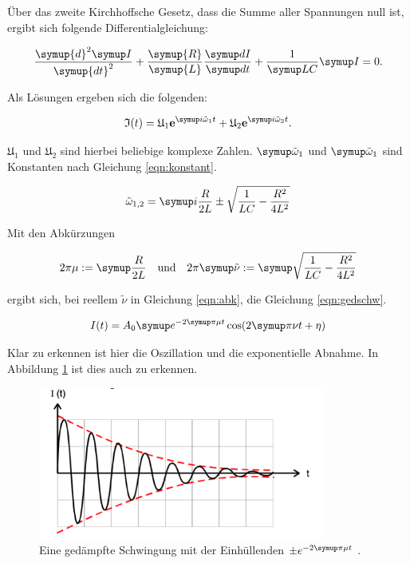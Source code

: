 Über das zweite Kirchhoffsche Gesetz, dass die Summe aller Spannungen null ist, ergibt
sich folgende Differentialgleichung:

\begin{equation}
  \frac{\symup{d}^2 \g{I}}{\symup{d t}^2} + \frac{\symup{R}}{\symup{L}}
  \frac{\g{d I}}{\g{d t}} + \frac{1}{\g{L C}} \g{I} = 0.
  \label{eqn:dgl}
\end{equation}

Als Lösungen ergeben sich die folgenden:

\begin{equation}
  \mathfrak{I}(t) = \mathfrak{U}_1 \textbf{e}^{\g{i\tilde{\omega}_1t}} + \mathfrak{U}_2
  \textbf{e}^{\g{i\tilde{\omega}_2t}}.
\end{equation}

$\mathfrak{U}_1$ und $\mathfrak{U}_2$ sind hierbei beliebige komplexe Zahlen.
$\g{\tilde{\omega}}_\text{1}$ und $\g{\tilde{\omega}}_\text{1}$ sind Konstanten nach Gleichung
\eqref{eqn:konstant}.

\begin{equation}
  \tilde{\omega}_{1,2} = \g{i\frac{R}{2 L} \pm \sqrt{\frac{1}{L C} - \frac{R^2}{4 L^2}}}
  \label{eqn:konstant}
\end{equation}

Mit den Abkürzungen

\begin{align}
  2 \pi \mu := \g{\frac{R}{2 L}} \quad \text{und} \quad 2 \pi \g{\tilde{\nu}} := \g{\sqrt{\frac{1}{L C} - \frac{R^2}{4 L^2}}}
  \label{eqn:abk}
\end{align}

ergibt sich, bei reellem $\tilde{\nu}$ in Gleichung \eqref{eqn:abk}, die Gleichung \eqref{eqn:gedschw}.

\begin{equation}
  I(t) = A_0 \g{e}^{-2 \g{\pi} \mu t} \cos(2 \g{\pi} \nu t + \eta)
  \label{eqn:gedschw}
\end{equation}

Klar zu erkennen ist hier die Oszillation und die exponentielle Abnahme.
In Abbildung \ref{fig:gedschw} ist dies auch zu erkennen.

\begin{figure}[h]
  \centering
  \includegraphics[height = 5cm]{gedschw.pdf}
  \caption{Eine gedämpfte Schwingung mit der Einhüllenden $\pm e^{-2\g{\pi}\mu t}$ \cite{anleitung}.}
  \label{fig:gedschw}
\end{figure}

